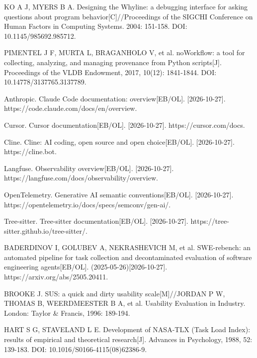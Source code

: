 {\begin{tjreflist}
\item KO A J, MYERS B A. Designing the Whyline: a debugging interface for asking questions about program behavior[C]//Proceedings of the SIGCHI Conference on Human Factors in Computing Systems. 2004: 151-158. DOI: 10.1145/985692.985712.
\item PIMENTEL J F, MURTA L, BRAGANHOLO V, et al. noWorkflow: a tool for collecting, analyzing, and managing provenance from Python scripts[J]. Proceedings of the VLDB Endowment, 2017, 10(12): 1841-1844. DOI: 10.14778/3137765.3137789.
\item Anthropic. Claude Code documentation: overview[EB/OL]. [2026-10-27]. https://code.claude.com/docs/en/overview.
\item Cursor. Cursor documentation[EB/OL]. [2026-10-27]. https://cursor.com/docs.
\item Cline. Cline: AI coding, open source and open choice[EB/OL]. [2026-10-27]. https://cline.bot.
\item Langfuse. Observability overview[EB/OL]. [2026-10-27]. https://langfuse.com/docs/observability/overview.
\item OpenTelemetry. Generative AI semantic conventions[EB/OL]. [2026-10-27]. https://opentelemetry.io/docs/specs/semconv/gen-ai/.
\item Tree-sitter. Tree-sitter documentation[EB/OL]. [2026-10-27]. https://tree-sitter.github.io/tree-sitter/.
\item BADERDINOV I, GOLUBEV A, NEKRASHEVICH M, et al. SWE-rebench: an automated pipeline for task collection and decontaminated evaluation of software engineering agents[EB/OL]. (2025-05-26)[2026-10-27]. https://arxiv.org/abs/2505.20411.
\item BROOKE J. SUS: a quick and dirty usability scale[M]//JORDAN P W, THOMAS B, WEERDMEESTER B A, et al. Usability Evaluation in Industry. London: Taylor \& Francis, 1996: 189-194.
\item HART S G, STAVELAND L E. Development of NASA-TLX (Task Load Index): results of empirical and theoretical research[J]. Advances in Psychology, 1988, 52: 139-183. DOI: 10.1016/S0166-4115(08)62386-9.
\end{tjreflist}
}

\newpage
{}

\begin{tjreviewbox}

  \vspace{8\baselineskip}
\end{tjreviewbox}

\begin{tjreviewbox}

  \vspace{6\baselineskip}
\end{tjreviewbox}
